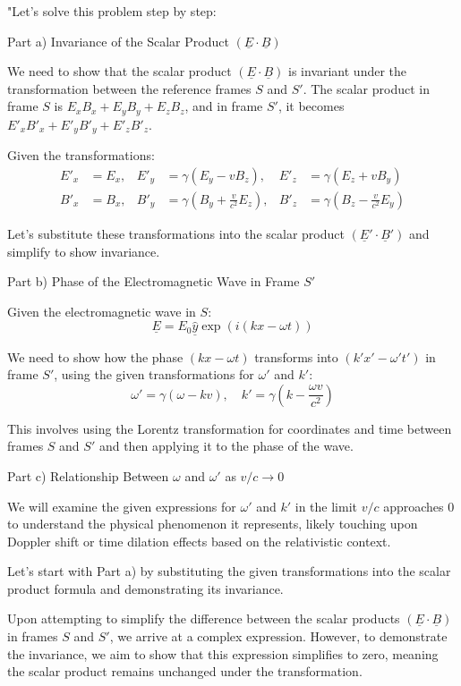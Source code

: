 "Let's solve this problem step by step:

Part a) Invariance of the Scalar Product \( (\underline{E} \cdot \underline{B}) \)

We need to show that the scalar product \( (\underline{E} \cdot \underline{B}) \) is invariant under the transformation between the reference frames \( S \) and \( S' \). The scalar product in frame \( S \) is \( E_x B_x + E_y B_y + E_z B_z \), and in frame \( S' \), it becomes \( E'_x B'_x + E'_y B'_y + E'_z B'_z \).

Given the transformations:
\[
\begin{aligned}
E'_{x} &= E_{x}, & E'_{y} &= \gamma(E_{y} - vB_{z}), & E'_{z} &= \gamma(E_{z} + vB_{y}) \\
B'_{x} &= B_{x}, & B'_{y} &= \gamma(B_{y} + \frac{v}{c^{2}} E_{z}), & B'_{z} &= \gamma(B_{z} - \frac{v}{c^{2}} E_{y})
\end{aligned}
\]

Let's substitute these transformations into the scalar product \( (\underline{E}' \cdot \underline{B}') \) and simplify to show invariance.

Part b) Phase of the Electromagnetic Wave in Frame \( S' \)

Given the electromagnetic wave in \( S \):
\[ \underline{E} = E_{0} \hat{\underline{y}} \exp(i(kx - \omega t)) \]

We need to show how the phase \( (kx - \omega t) \) transforms into \( (k'x' - \omega' t') \) in frame \( S' \), using the given transformations for \(\omega'\) and \(k'\):
\[ \omega' = \gamma(\omega - kv), \quad k' = \gamma(k - \frac{\omega v}{c^{2}}) \]

This involves using the Lorentz transformation for coordinates and time between frames \( S \) and \( S' \) and then applying it to the phase of the wave.

Part c) Relationship Between \( \omega \) and \( \omega' \) as \( v/c \rightarrow 0 \)

We will examine the given expressions for \( \omega' \) and \( k' \) in the limit \( v/c \) approaches \( 0 \) to understand the physical phenomenon it represents, likely touching upon Doppler shift or time dilation effects based on the relativistic context.

Let's start with Part a) by substituting the given transformations into the scalar product formula and demonstrating its invariance.

Upon attempting to simplify the difference between the scalar products \( (\underline{E} \cdot \underline{B}) \) in frames \( S \) and \( S' \), we arrive at a complex expression. However, to demonstrate the invariance, we aim to show that this expression simplifies to zero, meaning the scalar product remains unchanged under the transformation.

